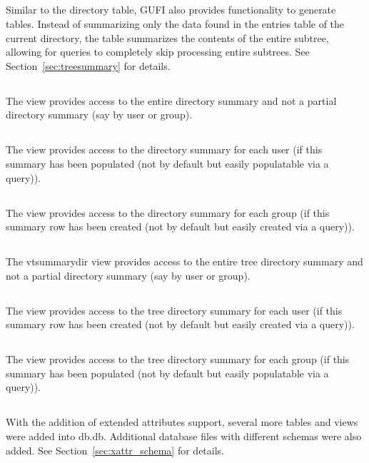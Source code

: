 \subsection{\treesummary}
Similar to the directory \summary table, GUFI also provides
functionality to generate \treesummary tables. Instead of summarizing
only the data found in the entries table of the current directory, the
\treesummary table summarizes the contents of the entire subtree,
allowing for queries to completely skip processing entire
subtrees. See Section~\ref{sec:treesummary} for details.

\subsection{\vsummarydir}
The \vsummarydir view provides access to the entire directory summary
and not a partial directory summary (say by user or group).

\subsection{\vsummaryuser}
The \vsummaryuser view provides access to the directory summary for
each user (if this summary has been populated (not by default but
easily populatable via a query)).

\subsection{\vsummarygroup}
The \vsummarygroup view provides access to the directory summary for
each group (if this summary row has been created (not by default but
easily created via a query)).

\subsection{\vtsummarydir}
The vtsummarydir view provides access to the entire tree directory
summary and not a partial directory summary (say by user or group).

\subsection{\vtsummaryuser}
The \vtsummaryuser view provides access to the tree directory summary
for each user (if this summary row has been created (not by default
but easily created via a query)).

\subsection{\vtsummarygroup}
The \vtsummarygroup view provides access to the tree directory summary
for each group (if this summary has been populated (not by default but
easily populatable via a query)).

\subsection{\xattrs}
With the addition of extended attributes support, several more tables
and views were added into db.db. Additional database files with
different schemas were also added. See Section~\ref{sec:xattr_schema}
for details.
